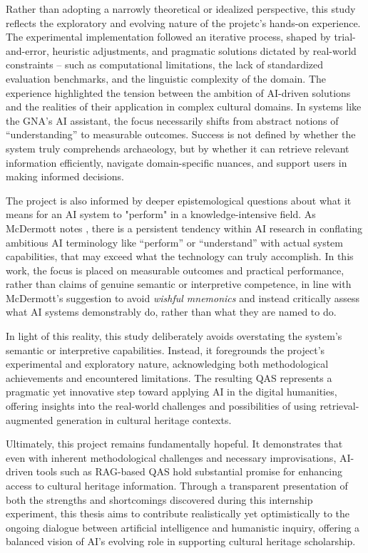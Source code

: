\begin{spacing}{1.5}
Rather than adopting a narrowly theoretical or idealized perspective, this study reflects the exploratory and evolving nature of the projetc's hands-on experience. The experimental implementation followed an iterative process, shaped by trial-and-error, heuristic adjustments, and pragmatic solutions dictated by real-world constraints -- such as computational limitations, the lack of standardized evaluation benchmarks, and the linguistic complexity of the domain. The experience highlighted the tension between the ambition of AI-driven solutions and the realities of their application in complex cultural domains. In systems like the GNA’s AI assistant, the focus necessarily shifts from abstract notions of “understanding” to measurable outcomes. Success is not defined by whether the system truly comprehends archaeology, but by whether it can retrieve relevant information efficiently, navigate domain-specific nuances, and support users in making informed decisions.

The project is also informed by deeper epistemological questions about what it means for an AI system to "perform" in a knowledge-intensive field. As McDermott notes \citep{mcdermott_artificial_1976}, there is a persistent tendency within AI research in conflating ambitious AI terminology like “perform” or “understand” with actual system capabilities, that may exceed what the technology can truly accomplish. In this work, the focus is placed on measurable outcomes and practical performance, rather than claims of genuine semantic or interpretive competence, in line with McDermott’s suggestion to avoid \textit{wishful mnemonics} and instead critically assess what AI systems demonstrably do, rather than what they are named to do.

In light of this reality, this study deliberately avoids overstating the system’s semantic or interpretive capabilities. Instead, it foregrounds the project’s experimental and exploratory nature, acknowledging both methodological achievements and encountered limitations. The resulting QAS represents a pragmatic yet innovative step toward applying AI in the digital humanities, offering insights into the real-world challenges and possibilities of using retrieval-augmented generation in cultural heritage contexts.

Ultimately, this project remains fundamentally hopeful. It demonstrates that even with inherent methodological challenges and necessary improvisations, AI-driven tools such as RAG-based QAS hold substantial promise for enhancing access to cultural heritage information. Through a transparent presentation of both the strengths and shortcomings discovered during this internship experiment, this thesis aims to contribute realistically yet optimistically to the ongoing dialogue between artificial intelligence and humanistic inquiry, offering a balanced vision of AI’s evolving role in supporting cultural heritage scholarship.

\end{spacing}